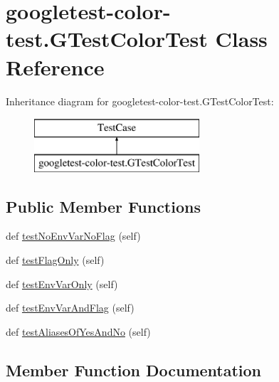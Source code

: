 \hypertarget{classgoogletest-color-test_1_1_g_test_color_test}{}\section{googletest-\/color-\/test.G\+Test\+Color\+Test Class Reference}
\label{classgoogletest-color-test_1_1_g_test_color_test}
Inheritance diagram for googletest-\/color-\/test.G\+Test\+Color\+Test\+:\begin{figure}[H]
\begin{center}
\leavevmode
\includegraphics[height=2.000000cm]{d0/dc5/classgoogletest-color-test_1_1_g_test_color_test}
\end{center}
\end{figure}
\subsection*{Public Member Functions}
\begin{DoxyCompactItemize}
\item 
def \mbox{\hyperlink{classgoogletest-color-test_1_1_g_test_color_test_ae36014618c6afc19fa6d77babf8faa88}{test\+No\+Env\+Var\+No\+Flag}} (self)
\item 
def \mbox{\hyperlink{classgoogletest-color-test_1_1_g_test_color_test_ade41e99b5486c9d947d9b817210174f6}{test\+Flag\+Only}} (self)
\item 
def \mbox{\hyperlink{classgoogletest-color-test_1_1_g_test_color_test_a1f0a2bab46c123e865a821307bd689de}{test\+Env\+Var\+Only}} (self)
\item 
def \mbox{\hyperlink{classgoogletest-color-test_1_1_g_test_color_test_a8f6cbbaa18feb66b8b03e6cc1f493f49}{test\+Env\+Var\+And\+Flag}} (self)
\item 
def \mbox{\hyperlink{classgoogletest-color-test_1_1_g_test_color_test_a82dd36b6a0fa82d417b7ec5e660c6e41}{test\+Aliases\+Of\+Yes\+And\+No}} (self)
\end{DoxyCompactItemize}


\subsection{Member Function Documentation}
\mbox{\label{classgoogletest-color-test_1_1_g_test_color_test_a82dd36b6a0fa82d417b7ec5e660c6e41}} 
